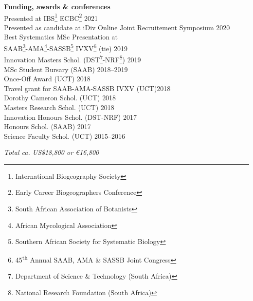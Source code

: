 \documentclass[10pt]{article}
\begin{document}
\begin{multicols}{2}

\textbf{Funding, awards \& conferences}\\ %

Presented at IBS\footnote{International Biogeography
  Society} ECBC\footnote{Early Career
  Biogeographers Conference}                       \hfill {\small       2021} \\
Presented as candidate at iDiv Online Joint
  Recruitement Symposium                           \hfill {\small       2020} \\
Best Systematics MSc Presentation at \\
\hspace{2em} SAAB\footnote{South African
  Association of Botanists}-AMA\footnote{African
  Mycological Association}-SASSB\footnote{Southern
  African Society for Systematic Biology}
  IVXV\footnote{45\textsuperscript{th} Annual SAAB,
  AMA \& SASSB Joint Congress} (tie)               \hfill {\small       2019} \\
Innovation Masters Schol. {\small (DST\footnote{
  Department of Science \& Technology (South
  Africa)}-NRF\footnote{National Research
  Foundation (South Africa)})}                     \hfill {\small       2019} \\
MSc Student Bursary {\small (SAAB)}                \hfill {\small 2018--2019} \\
Once-Off Award {\small (UCT)}                      \hfill {\small       2018} \\
Travel grant for SAAB-AMA-SASSB IVXV {\small (UCT)}\hfill {\small       2018} \\
Dorothy Cameron Schol. {\small (UCT)}              \hfill {\small       2018} \\
Masters Research Schol. {\small (UCT)}             \hfill {\small       2018} \\
Innovation Honours Schol. {\small (DST-NRF)}       \hfill {\small       2017} \\
Honours Schol. {\small (SAAB)}                     \hfill {\small       2017} \\
Science Faculty Schol. {\small (UCT)}              \hfill {\small 2015--2016}

\begin{center}
  \textit{Total ca. US\$18,800 or €16,800}
\end{center}


\end{multicols}
\end{document}

